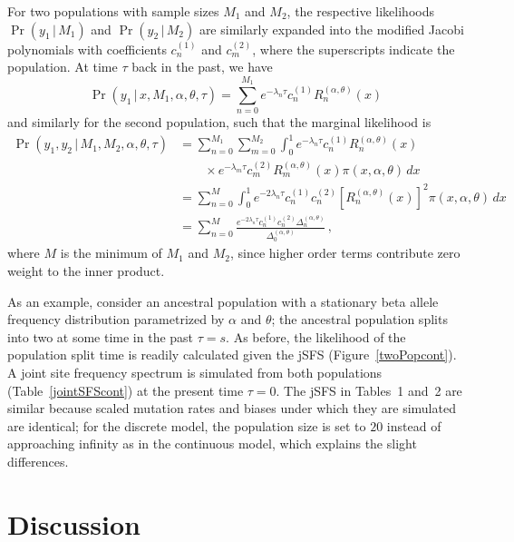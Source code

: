 \documentclass[preprint]{elsarticle}
\newcommand\given{{\,|\,}}
\begin{document}
For two populations with sample sizes $M_1$ and $M_2$, the respective likelihoods $\Pr(y_1\given M_1)$ and $\Pr(y_2\given M_2)$ are similarly expanded into the modified Jacobi polynomials with coefficients $c_n^{(1)}$ and $c_m^{(2)}$, where the superscripts indicate the population. At time $\tau$ back in the past, we have
\begin{equation}
    \Pr(y_1\given x, M_1,\alpha,\theta,\tau)=
    \sum_{n=0}^{M_1} e^{-\lambda_n\tau}c_n^{(1)}R_n^{(\alpha,\theta)}(x)
\end{equation}
and similarly for the second population, such that the marginal likelihood is
\begin{equation}
\begin{split}
    \Pr(y_1,y_2\given M_1,M_2,\alpha,\theta,\tau)&=
    \sum_{n=0}^{M_1}\sum_{m=0}^{M_2}\int_0^1 e^{-\lambda_n\tau}c_n^{(1)}R_n^{(\alpha,\theta)}(x)\\
    &\qquad\times e^{-\lambda_m\tau}c_m^{(2)} R_m^{(\alpha,\theta)}(x)\pi(x,\alpha,\theta)  \,dx\\&=
    \sum_{n=0}^{M}\int_0^1 e^{-2\lambda_n\tau}c_n^{(1)}c_n^{(2)} \left[R_n^{(\alpha,\theta)}(x)\right]^2\pi(x,\alpha,\theta)  \,dx\\
    &=\sum_{n=0}^{M}\frac{e^{-2\lambda_n\tau}c_n^{(1)} c_n^{(2)}\Delta_n^{(\alpha,\theta)}}{\Delta_0^{(\alpha,\theta)}}\,,
\end{split}
\end{equation}
where $M$ is the minimum of $M_1$ and $M_2$, since higher order terms contribute zero weight to the inner product. 

As an example, consider an ancestral population with a stationary beta allele frequency distribution parametrized by $\alpha$ and $\theta$; the ancestral population splits into two at some time in the past $\tau=s$. As before, the likelihood of the population split time is readily calculated given the jSFS (Figure~\ref{twoPopcont}). A joint site frequency spectrum is simulated from both populations (Table~\ref{jointSFScont}) at the present time $\tau=0$. The jSFS in Tables~1 and~2 are similar because scaled mutation rates and biases under which they are simulated are identical; for the discrete model, the population size is set to $20$  instead of approaching infinity as in the continuous model, which explains the slight differences.

\section{Discussion}
\end{document}
